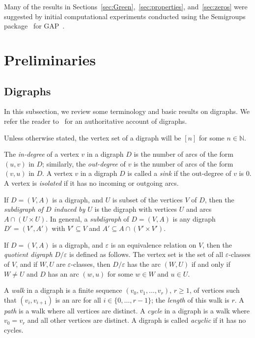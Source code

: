 \documentclass[ALCO,ThmDefs,Unicode,epreuves]{cedram}
\newcommand{\N}{\mathbb{N}}
\newcommand{\nset}{[n]}
\begin{document}
Many of the results in Sections~\ref{sec:Green},~\ref{sec:properties},
and~\ref{sec:zeros} were suggested by initial computational experiments
conducted using the Semigroups package~\cite{Mitchell2019aa} for GAP~\cite{GAP4}. 



\section{Preliminaries} \label{sec:preliminaries}
\subsection{Digraphs}
In this subsection, we review some terminology and basic results on digraphs.
We refer the reader to~\cite{Bang-Jensen2009aa} for an authoritative account of digraphs.

Unless otherwise stated, the vertex set of
a digraph will be $\nset$ for some $n\in \N$. 

The \emph{in-degree} of a vertex $v$ in a digraph $D$ is the number of arcs
of the form $(u, v)$ in $D$; similarly, the \emph{out-degree} of $v$ is the
number of arcs of the form $(v, u)$ in $D$. A vertex $v$ in a digraph $D$ is
called a \emph{sink} if the out-degree of $v$ is $0$. A vertex is
\emph{isolated} if it has no incoming or outgoing arcs. 

If $D = (V, A)$ is a digraph, and $U$ is subset of the vertices $V$ of $D$,
then the \emph{subdigraph of $D$ induced by $U$} is the digraph with vertices
$U$ and arcs $A \cap (U\times U)$. In general, a \emph{subdigraph} of $D =
(V,A)$ is any digraph $D' = (V', A')$ with $V' \subseteq V$ and $A' \subseteq
A\cap (V' \times V')$.

If $D=(V,A)$ is a digraph, and $\varepsilon$ is an equivalence relation on $V$,
then the \emph{quotient digraph} $D/\varepsilon$ is defined as follows. The
vertex set is the set of all $\varepsilon$-classes of $V$, and if $W,U$ are
$\varepsilon$-classes, then $D/\varepsilon$ has the arc $(W,U)$ if and only if
$W\not=U$ and $D$ has an arc $(w,u)$ for some $w\in W$ and $u\in U$.

A \emph{walk} in a digraph is a finite sequence $(v_0, v_1, \ldots,
v_r)$, $r\geq 1$, of vertices such that $(v_i, v_{i + 1})$ is an arc for all
$i\in \{0, \ldots, r - 1\}$; the \emph{length} of this walk is $r$. A
\emph{path} is a walk where all vertices are distinct. A \emph{cycle} in a
digraph is a walk where $v_0 = v_r$ and all other vertices are distinct.
A digraph is called \emph{acyclic} if it has no cycles.
\end{document}
